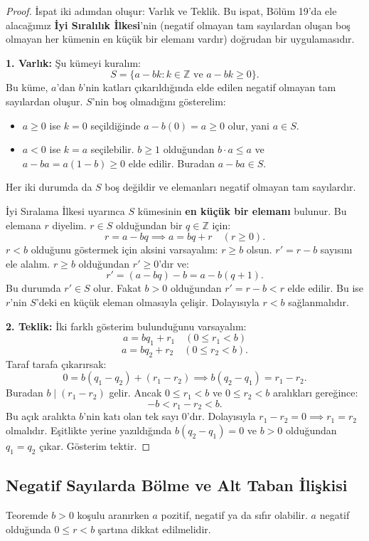 \begin{proof}
İspat iki adımdan oluşur: Varlık ve Teklik. Bu ispat, Bölüm 19'da ele alacağımız \textbf{İyi Sıralılık İlkesi}'nin (negatif olmayan tam sayılardan oluşan boş olmayan her kümenin en küçük bir elemanı vardır) doğrudan bir uygulamasıdır.

\textbf{1. Varlık:}
Şu kümeyi kuralım:
\[
S = \{a - b k : k \in \mathbb{Z} \text{ ve } a - bk \ge 0\}.
\]
Bu küme, $a$'dan $b$'nin katları çıkarıldığında elde edilen negatif olmayan tam sayılardan oluşur.
$S$'nin boş olmadığını gösterelim:
\begin{itemize}
    \item $a \ge 0$ ise $k = 0$ seçildiğinde $a - b(0) = a \ge 0$ olur, yani $a \in S$.
    \item $a < 0$ ise $k = a$ seçilebilir. $b \ge 1$ olduğundan $b \cdot a \le a$ ve $a - ba = a(1-b) \ge 0$ elde edilir. Buradan $a - ba \in S$.
\end{itemize}
Her iki durumda da $S$ boş değildir ve elemanları negatif olmayan tam sayılardır. 

İyi Sıralama İlkesi uyarınca $S$ kümesinin \textbf{en küçük bir elemanı} bulunur. Bu elemana $r$ diyelim. $r \in S$ olduğundan bir $q \in \mathbb{Z}$ için:
\[
r = a - bq \implies a = bq + r \quad (r \ge 0).
\]
$r < b$ olduğunu göstermek için aksini varsayalım: $r \ge b$ olsun.
$r' = r - b$ sayısını ele alalım. $r \ge b$ olduğundan $r' \ge 0$'dır ve:
\[
r' = (a - bq) - b = a - b(q + 1).
\]
Bu durumda $r' \in S$ olur. Fakat $b > 0$ olduğundan $r' = r - b < r$ elde edilir. Bu ise $r$'nin $S$'deki en küçük eleman olmasıyla çelişir. Dolayısıyla $r < b$ sağlanmalıdır.

\textbf{2. Teklik:}
İki farklı gösterim bulunduğunu varsayalım:
\[
a = b q_1 + r_1 \quad (0 \le r_1 < b)
\]
\[
a = b q_2 + r_2 \quad (0 \le r_2 < b).
\]
Taraf tarafa çıkarırsak:
\[
0 = b(q_1 - q_2) + (r_1 - r_2) \implies b(q_2 - q_1) = r_1 - r_2.
\]
Buradan $b \mid (r_1 - r_2)$ gelir. 
Ancak $0 \le r_1 < b$ ve $0 \le r_2 < b$ aralıkları gereğince:
\[
-b < r_1 - r_2 < b.
\]
Bu açık aralıkta $b$'nin katı olan tek sayı 0'dır.
Dolayısıyla $r_1 - r_2 = 0 \implies r_1 = r_2$ olmalıdır.
Eşitlikte yerine yazıldığında $b(q_2 - q_1) = 0$ ve $b > 0$ olduğundan $q_1 = q_2$ çıkar. Gösterim tektir.
\end{proof}

\subsection{Negatif Sayılarda Bölme ve Alt Taban İlişkisi}
Teoremde $b > 0$ koşulu aranırken $a$ pozitif, negatif ya da sıfır olabilir. $a$ negatif olduğunda $0 \le r < b$ şartına dikkat edilmelidir.

